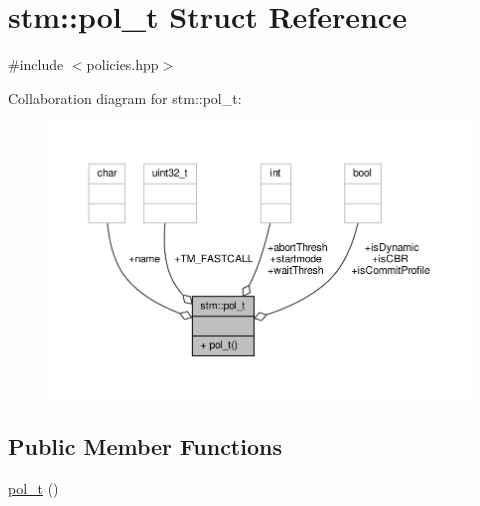 \hypertarget{structstm_1_1pol__t}{\section{stm\-:\-:pol\-\_\-t Struct Reference}
\label{structstm_1_1pol__t}
}


{\ttfamily \#include $<$policies.\-hpp$>$}



Collaboration diagram for stm\-:\-:pol\-\_\-t\-:
\nopagebreak
\begin{figure}[H]
\begin{center}
\leavevmode
\includegraphics[width=350pt]{structstm_1_1pol__t__coll__graph}
\end{center}
\end{figure}
\subsection*{Public Member Functions}
\begin{DoxyCompactItemize}
\item 
\hyperlink{structstm_1_1pol__t_abcdd56b7661df6f4d7ad42df6076e0ce}{pol\-\_\-t} ()
\end{DoxyCompactItemize}
